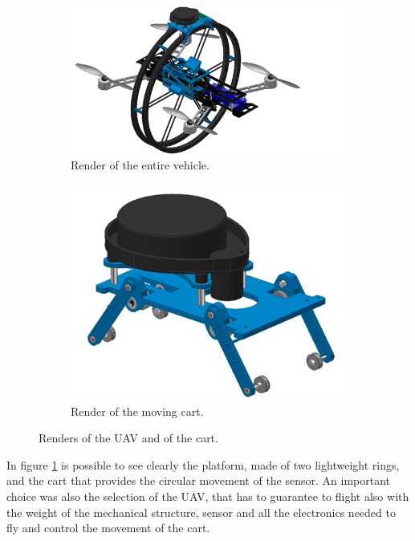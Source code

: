 \begin{figure}[h]
	\centering
	\begin{subfigure}[t]{0.49\textwidth}
		\centering
		\includegraphics[scale = 0.45]{images/render1.png}
		\caption{Render of the entire vehicle.}
		\label{subfig:render1}
	\end{subfigure} 
	\begin{subfigure}[t]{0.49\textwidth}
		\centering
		\includegraphics[scale = 0.5]{images/render2.png}
		\caption{Render of the moving cart.}
		\label{subfig:render2}
	\end{subfigure}
	\caption{Renders of the UAV and of the cart.}
	\label{fig:renders}
\end{figure}

\noindent In figure \ref{subfig:render1} is possible to see clearly the platform, made of two lightweight rings, and the cart that provides the circular movement of the sensor. An important choice was also the selection of the UAV, that has to guarantee to flight also with the weight of the mechanical structure, sensor and all the electronics needed to fly and control the movement of the cart.

